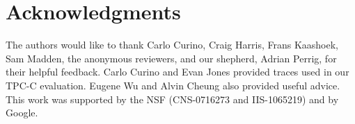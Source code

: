 \section*{Acknowledgments}

The authors would like to thank Carlo Curino, Craig Harris, Frans
Kaashoek, Sam Madden, the anonymous reviewers, and our shepherd, Adrian
Perrig, for their helpful feedback.  Carlo Curino and Evan Jones provided
traces used in our TPC-C evaluation. Eugene Wu and Alvin Cheung also
provided useful advice. This work was supported by the NSF (CNS-0716273
and IIS-1065219) and by Google.

